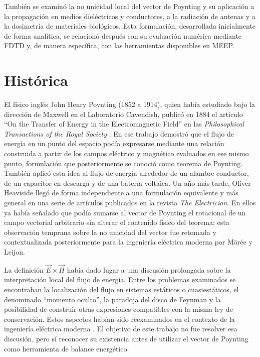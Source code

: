 También se examinó la no unicidad local del vector de Poynting y su aplicación a la propagación en medios dieléctricos y conductores, a la radiación de antenas y a la dosimetría de materiales biológicos. Esta formulación, desarrollada inicialmente de forma analítica, se relacionó después con su evaluación numérica mediante FDTD y, de manera específica, con las herramientas disponibles en MEEP.

\section{Histórica}
El físico inglés John Henry Poynting (1852 a 1914), quien había estudiado bajo la dirección de Maxwell en el Laboratorio Cavendish, publicó en 1884 el artículo ``On the Transfer of Energy in the Electromagnetic Field'' en las \textit{Philosophical Transactions of the Royal Society} \cite{Poynting1884}. En ese trabajo demostró que el flujo de energía en un punto del espacio podía expresarse mediante una relación construida a partir de los campos eléctrico y magnético evaluados en ese mismo punto, formulación que posteriormente se conoció como teorema de Poynting. También aplicó esta idea al flujo de energía alrededor de un alambre conductor, de un capacitor en descarga y de una batería voltaica. Un año más tarde, Oliver Heaviside llegó de forma independiente a una formulación equivalente y más general en una serie de artículos publicados en la revista \textit{The Electrician}. En ellos ya había señalado que podía sumarse al vector de Poynting el rotacional de un campo vectorial arbitrario sin alterar el contenido físico del teorema; esta observación temprana sobre la no unicidad del vector fue retomada y contextualizada posteriormente para la ingeniería eléctrica moderna por Mörée y Leijon.

La definición $\vec{E}\times\vec{H}$ había dado lugar a una discusión prolongada sobre la interpretación local del flujo de energía. Entre los problemas examinados se encontraban la localización del flujo en sistemas estáticos o cuasiestáticos, el denominado ``momento oculto'', la paradoja del disco de Feynman y la posibilidad de construir otras expresiones compatibles con la misma ley de conservación. Estos aspectos habían sido reexaminados en el contexto de la ingeniería eléctrica moderna \cite{Moree2022}. El objetivo de este trabajo no fue resolver esa discusión, pero sí reconocer su existencia antes de utilizar el vector de Poynting como herramienta de balance energético.

